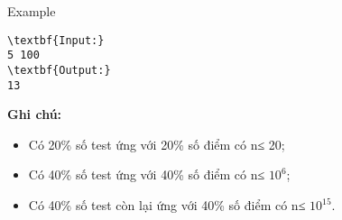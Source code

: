 Example
\begin{verbatim}
\textbf{Input:}
5 100
\textbf{Output:}
13
\end{verbatim}

\textbf{\textbf{Ghi chú:}}
\begin{itemize}
	\item Có 20\% số test ứng với 20\% số điểm có n≤ 20;
	\item Có 40\% số test ứng với 40\% số điểm có n≤ $10^{6}$;
	\item Có 40\% số test còn lại ứng với 40\% số điểm có n≤ $10^{15}$.
\end{itemize}
